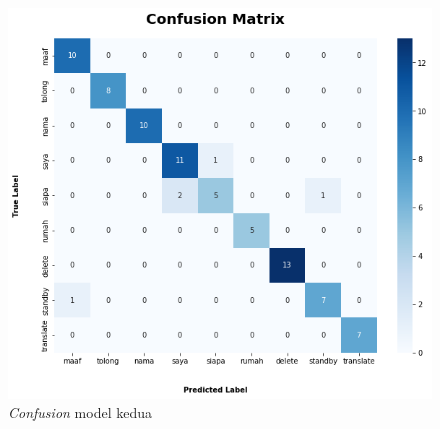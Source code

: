 \begin{figure}[H]
  \centering

  \includegraphics[scale=0.6]{gambar/bab4-uji-model-second-cf.png}

  \caption{\emph{Confusion} model kedua}
  \label{fig:model2-cf}
\end{figure}


